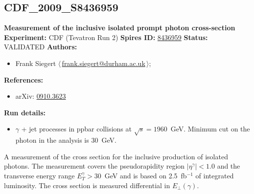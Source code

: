 \subsection[CDF\_2009\_S8436959]{CDF\_2009\_S8436959\,\cite{Aaltonen:2009ty}}
\textbf{Measurement of the inclusive isolated prompt photon cross-section}\newline
\textbf{Experiment:} CDF (Tevatron Run 2) \newline
\textbf{Spires ID:} \href{http://www.slac.stanford.edu/spires/find/hep/www?rawcmd=key+8436959}{8436959}\newline
\textbf{Status:} VALIDATED\newline
\textbf{Authors:}
\begin{itemize}
  \item Frank Siegert $\langle\,$\href{mailto:frank.siegert@durham.ac.uk}{frank.siegert@durham.ac.uk}$\,\rangle$;
\end{itemize}
\textbf{References:}
\begin{itemize}
  \item arXiv: \href{http://arxiv.org/abs/0910.3623}{0910.3623}
\end{itemize}
\textbf{Run details:}
\begin{itemize}

  \item $\gamma$ + jet processes in ppbar collisions at $\sqrt{s} = 1960$~GeV. Minimum \pT cut on the photon in the analysis is 30~GeV.\end{itemize}

\noindent A measurement of the cross section for the inclusive production of isolated photons. The measurement covers the pseudorapidity region $|\eta^\gamma|<1.0$ and the transverse energy range $E_T^\gamma>30$~GeV and is based on 2.5~fb$^{-1}$ of integrated luminosity. The cross section is measured differential in $E_\perp(\gamma)$.

\clearpage


\clearpage

